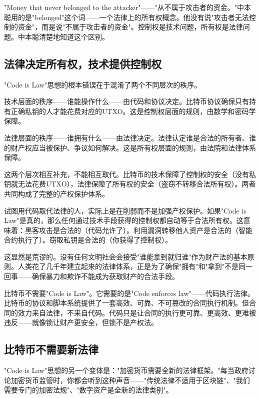 \documentclass[a4paper,12pt,openany]{ctexbook}
\begin{document}
"Money that never belonged to the attacker"——"从不属于攻击者的资金。"中本聪用的是"belonged"这个词——一个法律上的所有权概念。他没有说"攻击者无法控制的资金"，而是说"不属于攻击者的资金"。控制权是技术问题，所有权是法律问题。中本聪清楚地知道这个区别。


\subsection*{法律决定所有权，技术提供控制权}


"Code is Law"思想的根本错误在于混淆了两个不同层次的秩序。

技术层面的秩序——谁能操作什么——由代码和协议决定。比特币协议确保只有持有正确私钥的人才能花费对应的UTXO。这是控制权层面的规则，由数学和密码学保障。

法律层面的秩序——谁拥有什么——由法律决定。法律认定谁是合法的所有者、谁的财产权应当被保护、争议如何解决。这是所有权层面的规则，由法院和法律体系保障。

这两个层次相互补充，不能相互取代。比特币的技术保障了控制权的安全（没有私钥就无法花费UTXO），法律保障了所有权的安全（盗窃不转移合法所有权）。两者共同构成了完整的产权保护体系。

试图用代码取代法律的人，实际上是在削弱而不是加强产权保护。如果"Code is Law"是真的，那么任何通过技术手段获得的控制权都自动等于合法所有权。这意味着：黑客攻击是合法的（代码允许了）。利用漏洞转移他人资产是合法的（智能合约执行了）。窃取私钥是合法的（你获得了控制权）。

这显然是荒谬的。没有任何文明社会会接受"谁能拿到就归谁"作为财产法的基本原则。人类花了几千年建立起来的法律体系，正是为了确保"拥有"和"拿到"不是同一回事——确保暴力和欺诈不能成为获取财产的合法手段。

比特币不需要"Code is Law"。它需要的是"Code enforces law"——代码执行法律。比特币的协议和脚本系统提供了一套高效、可靠、不可篡改的合同执行机制。但合同的效力来自法律，不来自代码。代码只是让合同的执行更可靠、更高效、更难被违反——就像锁让财产更安全，但锁不是产权法。


\subsection*{比特币不需要新法律}


"Code is Law"思想的另一个变体是："加密货币需要全新的法律框架。"每当政府讨论加密货币监管时，你都会听到这种声音——"传统法律不适用于区块链"、"我们需要专门的加密法规"、"数字资产是全新的法律类别"。
\end{document}
